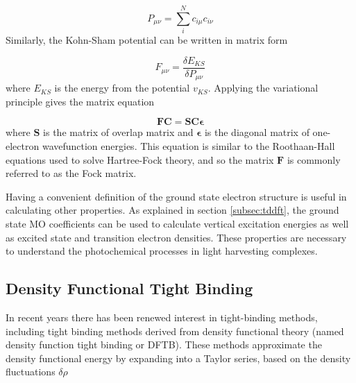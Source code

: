 \begin{equation}
    P_{\mu\nu} = \sum_i^N c_{i \mu} c_{i \nu}
\end{equation}
%
Similarly, the Kohn-Sham potential can be written in matrix form 

\begin{equation}
    F_{\mu \nu} = \frac{\delta E_{KS}}{\delta P_{\mu\nu}}
\end{equation}
%
where $E_{KS}$ is the energy from the potential $v_{KS}$. Applying the variational
principle gives the matrix equation

\begin{equation}
    \mathbf{F} \mathbf{C} = \mathbf{S} \mathbf{C} \mathbf{\epsilon}
\end{equation}
%
where $\mathbf{S}$ is the matrix of overlap matrix and $\mathbf{\epsilon}$ is the
diagonal matrix of one-electron wavefunction energies. This equation is similar 
to the Roothaan-Hall equations used to solve Hartree-Fock theory, and so the matrix
$\mathbf{F}$ is commonly referred to as the Fock matrix.

Having a convenient definition of the ground state electron structure is useful
in calculating other properties. As explained in section \ref{subsec:tddft}, the
ground state MO coefficients can be used to calculate vertical excitation energies
as well as excited state and transition electron densities. These properties are
necessary to understand the photochemical processes in light harvesting complexes.

\subsection{Density Functional Tight Binding}
\label{subsec:tight_binding}
In recent years there has been renewed interest in tight-binding methods, including
tight binding methods derived from density functional theory (named density function 
tight binding or DFTB)\cite{Porezag1994}. These methods approximate the density 
functional energy by expanding into a Taylor series, based on the density fluctuations
$\delta\rho$\cite{Koskinen2009}

